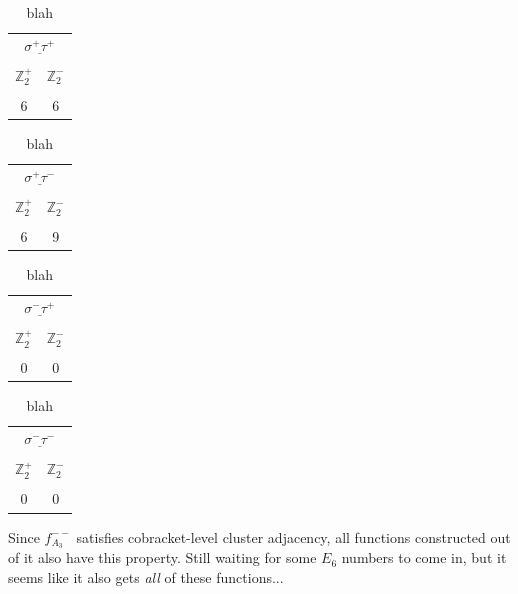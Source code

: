 \documentclass[11pt]{article}
\begin{document}
\begin{table}
\begin{center}
\begin{tabular}{ c | c |}
\multicolumn{2}{c}{$\underline{\ \sigma^+ \tau^+\ }$} \\[-1em]
\multicolumn{1}{c}{} & \multicolumn{1}{c}{} \\
 $\mathbb{Z}_2^+$ & \multicolumn{1}{c}{$\mathbb{Z}_2^-$} \\[-1em]
& \multicolumn{1}{c}{} \\
\hline
6 & \multicolumn{1}{c}{6} 
\end{tabular} 
\hspace{1.2cm}
\begin{tabular}{ c | c |}
\multicolumn{2}{c}{$\underline{\ \sigma^+ \tau^-\ }$} \\[-1em]
\multicolumn{1}{c}{} & \multicolumn{1}{c}{} \\
 $\mathbb{Z}_2^+$ & \multicolumn{1}{c}{$\mathbb{Z}_2^-$} \\[-1em]
 & \multicolumn{1}{c}{} \\
\hline
6 & \multicolumn{1}{c}{9}
\end{tabular} 
\hspace{1.2cm}
\begin{tabular}{ c | c |}
\multicolumn{2}{c}{$\underline{\ \sigma^- \tau^+\ }$} \\[-1em]
\multicolumn{1}{c}{} & \multicolumn{1}{c}{} \\
 $\mathbb{Z}_2^+$ & \multicolumn{1}{c}{$\mathbb{Z}_2^-$} \\[-1em]
& \multicolumn{1}{c}{} \\
\hline
0 & \multicolumn{1}{c}{0} 
\end{tabular} 
\hspace{1.2cm}
\begin{tabular}{ c | c |}
\multicolumn{2}{c}{$\underline{\ \sigma^- \tau^-\ }$} \\[-1em]
\multicolumn{1}{c}{} & \multicolumn{1}{c}{} \\
 $\mathbb{Z}_2^+$ & \multicolumn{1}{c}{$\mathbb{Z}_2^-$} \\[-1em]
 & \multicolumn{1}{c}{} \\
\hline
0 & \multicolumn{1}{c}{0} 
\end{tabular} 

\end{center}
\caption{blah}
\label{table:nonclassical_A3_constructible_dimensions}
\end{table}

Since $f_{A_3}^{--}$ satisfies cobracket-level cluster adjacency, all functions constructed out of it also have this property. Still waiting for some $E_6$ numbers to come in, but it seems like it also gets \emph{all} of these functions...
\end{document}
